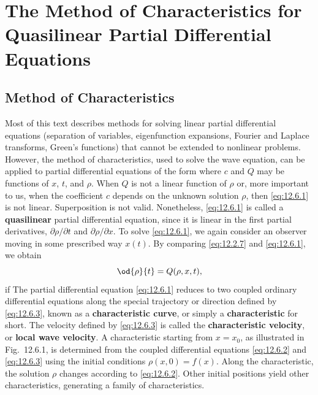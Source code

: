 \section{The Method of Characteristics for Quasilinear Partial Differential Equations}
\label{sec:quasilinear}

\subsection{Method of Characteristics}
\label{sec:quasilinear-method}

Most of this text describes methods for solving linear partial differential equations (separation of variables, eigenfunction expansions, Fourier and Laplace transforms, Green's functions) that cannot be extended to nonlinear problems.  However, the method of characteristics, used to solve the wave equation, can be applied to partial differential equations of the form
where $c$ and $Q$ may be functions of $x$, $t$, and $\rho$.  When $Q$ is not a linear function of $\rho$ or, more important to us, when the coefficient $c$ depends on the unknown solution $\rho$, then \eqref{eq:12.6.1} is not linear.  Superposition is not valid.  Nonetheless, \eqref{eq:12.6.1} is called a \textbf{quasilinear} partial differential equation, since it is linear in the first partial derivatives, $\partial\rho/\partial t$ and $\partial\rho/\partial x$.  To solve \eqref{eq:12.6.1}, we again consider an observer moving in some prescribed way $x(t)$.  By comparing \eqref{eq:12.2.7} and \eqref{eq:12.6.1}, we obtain
\begin{equation}
\label{eq:12.6.2}
\od{\rho}{t} = Q(\rho, x, t),
\end{equation}
if
The partial differential equation \eqref{eq:12.6.1} reduces to two coupled ordinary differential equations along the special trajectory or direction defined by \eqref{eq:12.6.3}, known as a \textbf{characteristic curve}, or simply a \textbf{characteristic} for short.  The velocity defined by \eqref{eq:12.6.3} is called the \textbf{characteristic velocity}, or \textbf{local wave velocity}.  A characteristic starting from $x = x_0$, as illustrated in Fig.~12.6.1, is determined from the coupled differential equations \eqref{eq:12.6.2} and \eqref{eq:12.6.3} using the initial conditions $\rho(x,0) = f(x)$.  Along the characteristic, the solution $\rho$ changes according to \eqref{eq:12.6.2}.  Other initial positions yield other characteristics, generating a family of characteristics.

